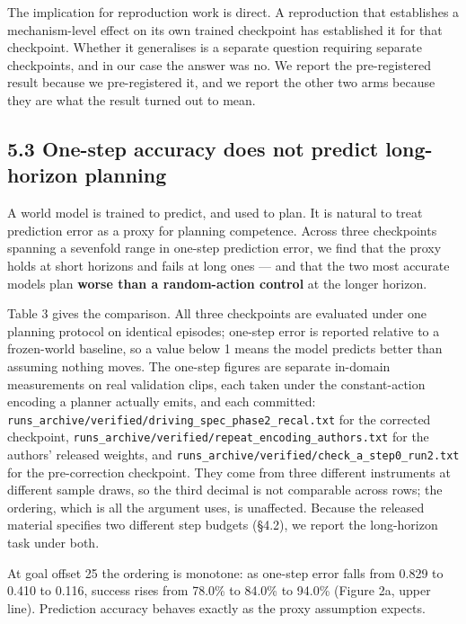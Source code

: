 \documentclass[10pt]{article}
\begin{document}
The implication for reproduction work is direct. A reproduction that establishes
a mechanism-level effect on its own trained checkpoint has established it for
that checkpoint. Whether it generalises is a separate question requiring
separate checkpoints, and in our case the answer was no. We report the
pre-registered result because we pre-registered it, and we report the other two
arms because they are what the result turned out to mean.

\subsection{5.3 One-step accuracy does not predict long-horizon planning}\label{one-step-accuracy-does-not-predict-long-horizon-planning}

A world model is trained to predict, and used to plan. It is natural to treat
prediction error as a proxy for planning competence. Across three checkpoints
spanning a sevenfold range in one-step prediction error, we find that the proxy
holds at short horizons and fails at long ones --- and that the two most accurate
models plan \textbf{worse than a random-action control} at the longer horizon.

Table 3 gives the comparison. All three checkpoints are evaluated under one planning protocol on identical episodes; one-step error is reported relative to a frozen-world baseline, so a value below 1 means the model predicts better than assuming nothing moves. The one-step figures are separate in-domain measurements on real validation clips, each taken under the constant-action encoding a planner actually emits, and each committed: \texttt{runs\_archive/verified/driving\_spec\_phase2\_recal.txt} for the corrected checkpoint, \texttt{runs\_archive/verified/repeat\_encoding\_authors.txt} for the authors' released weights, and \texttt{runs\_archive/verified/check\_a\_step0\_run2.txt} for the pre-correction checkpoint. They come from three different instruments at different sample draws, so the third decimal is not comparable across rows; the ordering, which is all the argument uses, is unaffected. Because the released material specifies two different
step budgets (\S{}4.2), we report the long-horizon task under both.

At goal offset 25 the ordering is monotone: as one-step error falls from 0.829 to 0.410 to 0.116, success rises from 78.0\% to 84.0\% to 94.0\% (Figure 2a, upper line). Prediction accuracy behaves exactly as the proxy assumption expects.
\end{document}
